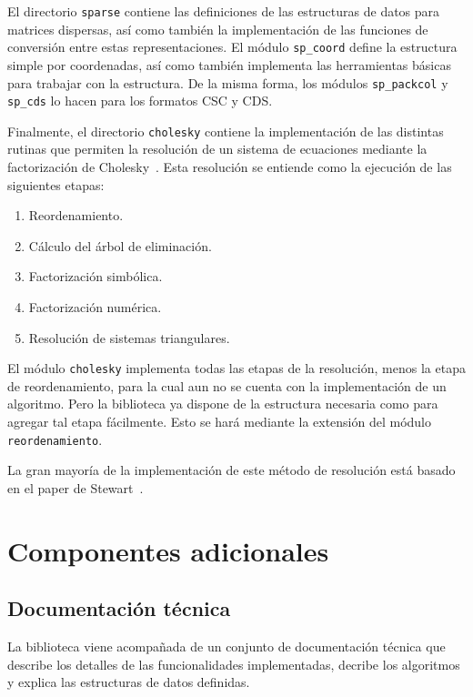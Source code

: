 \documentclass[a4paper,10pt]{article}
\begin{document}
El directorio \texttt{sparse} contiene las definiciones de las estructuras de datos para matrices dispersas, así como también la implementación de las funciones de conversión entre estas representaciones.
El módulo \texttt{sp\_coord} define la estructura simple por coordenadas, así como también implementa las herramientas básicas para trabajar con la estructura. De la misma forma, los módulos \texttt{sp\_packcol} y \texttt{sp\_cds} lo hacen para los formatos CSC y CDS.

Finalmente, el directorio \texttt{cholesky} contiene la implementación de las distintas rutinas que permiten la resolución de un sistema de ecuaciones mediante la factorización de Cholesky~\cite{cholesky}. Esta resolución se entiende como la ejecución de las siguientes etapas:
\begin{enumerate}
 \item Reordenamiento.
 \item Cálculo del árbol de eliminación.
 \item Factorización simbólica.
 \item Factorización numérica.
 \item Resolución de sistemas triangulares.
\end{enumerate}

\pagebreak
El módulo \texttt{cholesky} implementa todas las etapas de la resolución, menos la etapa de reordenamiento, para la cual aun no se cuenta con la implementación de un algoritmo. Pero la biblioteca ya dispone de la estructura necesaria como para agregar tal etapa fácilmente. Esto se hará mediante la extensión del módulo \texttt{reordenamiento}.

La gran mayoría de la implementación de este método de resolución está basado en el paper de Stewart~\cite{stewart}. 


\section{Componentes adicionales}
\label{sec_componentes}
\subsection{Documentación técnica}
La biblioteca viene acompañada de un conjunto de documentación técnica que describe los detalles de las funcionalidades implementadas, decribe los algoritmos y explica las estructuras de datos definidas.
\end{document}
